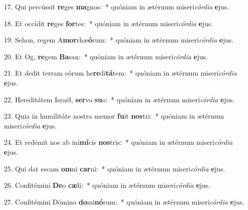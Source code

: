 17. Qui percússit \textbf{re}ges \textbf{ma}gnos:~*  quóniam in ætérnum miseri\textit{cór}\textit{di}\textit{a} \textbf{e}jus.\

18. Et occídit \textbf{re}ges \textbf{for}tes:~*  quóniam in ætérnum miseri\textit{cór}\textit{di}\textit{a} \textbf{e}jus.\

19. Sehon, regem A\textbf{mor}rhæ\textbf{ó}rum:~*  quóniam in ætérnum miseri\textit{cór}\textit{di}\textit{a} \textbf{e}jus.\

20. Et Og, \textbf{re}gem \textbf{Ba}san:~*  quóniam in ætérnum miseri\textit{cór}\textit{di}\textit{a} \textbf{e}jus.\

21. Et dedit terram eórum he\textbf{re}di\textbf{tá}tem:~*  quóniam in ætérnum miseri\textit{cór}\textit{di}\textit{a} \textbf{e}jus.\

22. Hereditátem Israël, \textbf{ser}vo \textbf{su}o:~*  quóniam in ætérnum miseri\textit{cór}\textit{di}\textit{a} \textbf{e}jus.\

23. Quia in humilitáte nostra memor \textbf{fu}it \textbf{nos}tri:~*  quóniam in ætérnum miseri\textit{cór}\textit{di}\textit{a} \textbf{e}jus.\

24. Et redémit nos ab ini\textbf{mí}cis \textbf{nos}tris:~*  quóniam in ætérnum miseri\textit{cór}\textit{di}\textit{a} \textbf{e}jus.\

25. Qui dat escam \textbf{om}ni \textbf{car}ni:~*  quóniam in ætérnum miseri\textit{cór}\textit{di}\textit{a} \textbf{e}jus.\

26. Confitémini \textbf{De}o \textbf{cæ}li:~*  quóniam in ætérnum miseri\textit{cór}\textit{di}\textit{a} \textbf{e}jus.\

27. Confitémini Dómino \textbf{do}mi\textbf{nó}rum:~*  quóniam in ætérnum miseri\textit{cór}\textit{di}\textit{a} \textbf{e}jus.\

